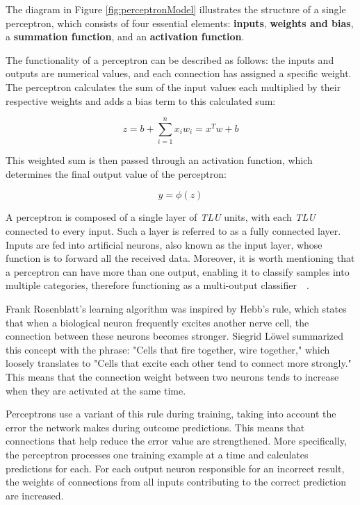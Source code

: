 The diagram in Figure \ref{fig:perceptronModel} illustrates the structure of a single perceptron, which consists of four essential elements: \textbf{inputs}, \textbf{weights and bias}, a \textbf{summation function}, and an \textbf{activation function}.

The functionality of a perceptron can be described as follows: the inputs and outputs are numerical values, and each connection has assigned a specific weight. The perceptron calculates the sum of the input values each multiplied by their respective weights and adds a bias term to this calculated sum:

\begin{equation}
z = b + \sum_{i=1}^{n} x_iw_i = x^Tw + b
\end{equation}

This weighted sum is then passed through an activation function, which determines the final output value of the perceptron:

\begin{equation}
y = \phi(z)
\end{equation}

A perceptron is composed of a single layer of \textit{TLU} units, with each \textit{TLU} connected to every input. Such a layer is referred to as a fully connected layer. Inputs are fed into artificial neurons, also known as the input layer, whose function is to forward all the received data. Moreover, it is worth mentioning that a perceptron can have more than one output, enabling it to classify samples into multiple categories, therefore functioning as a multi-output classifier~\cite{UMzUSLiTF}~.

Frank Rosenblatt's learning algorithm was inspired by Hebb's rule, which states that when a biological neuron frequently excites another nerve cell, the connection between these neurons becomes stronger. Siegrid Löwel summarized this concept with the phrase: "Cells that fire together, wire together," which loosely translates to "Cells that excite each other tend to connect more strongly." This means that the connection weight between two neurons tends to increase when they are activated at the same time.

Perceptrons use a variant of this rule during training, taking into account the error the network makes during outcome predictions. This means that connections that help reduce the error value are strengthened. More specifically, the perceptron processes one training example at a time and calculates predictions for each. For each output neuron responsible for an incorrect result, the weights of connections from all inputs contributing to the correct prediction are increased. 

